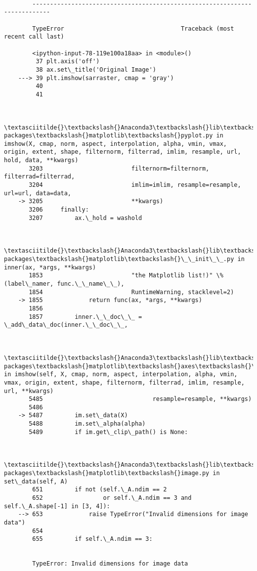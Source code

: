 \documentclass[11pt]{article}
\begin{document}
    \begin{Verbatim}[commandchars=\\\{\}]

        ---------------------------------------------------------------------------

        TypeError                                 Traceback (most recent call last)

        <ipython-input-78-119e100a18aa> in <module>()
         37 plt.axis('off')
         38 ax.set\_title('Original Image')
    ---> 39 plt.imshow(sarraster, cmap = 'gray')
         40 
         41 
    

        \textasciitilde{}\textbackslash{}Anaconda3\textbackslash{}lib\textbackslash{}site-packages\textbackslash{}matplotlib\textbackslash{}pyplot.py in imshow(X, cmap, norm, aspect, interpolation, alpha, vmin, vmax, origin, extent, shape, filternorm, filterrad, imlim, resample, url, hold, data, **kwargs)
       3203                         filternorm=filternorm, filterrad=filterrad,
       3204                         imlim=imlim, resample=resample, url=url, data=data,
    -> 3205                         **kwargs)
       3206     finally:
       3207         ax.\_hold = washold
    

        \textasciitilde{}\textbackslash{}Anaconda3\textbackslash{}lib\textbackslash{}site-packages\textbackslash{}matplotlib\textbackslash{}\_\_init\_\_.py in inner(ax, *args, **kwargs)
       1853                         "the Matplotlib list!)" \% (label\_namer, func.\_\_name\_\_),
       1854                         RuntimeWarning, stacklevel=2)
    -> 1855             return func(ax, *args, **kwargs)
       1856 
       1857         inner.\_\_doc\_\_ = \_add\_data\_doc(inner.\_\_doc\_\_,
    

        \textasciitilde{}\textbackslash{}Anaconda3\textbackslash{}lib\textbackslash{}site-packages\textbackslash{}matplotlib\textbackslash{}axes\textbackslash{}\_axes.py in imshow(self, X, cmap, norm, aspect, interpolation, alpha, vmin, vmax, origin, extent, shape, filternorm, filterrad, imlim, resample, url, **kwargs)
       5485                               resample=resample, **kwargs)
       5486 
    -> 5487         im.set\_data(X)
       5488         im.set\_alpha(alpha)
       5489         if im.get\_clip\_path() is None:
    

        \textasciitilde{}\textbackslash{}Anaconda3\textbackslash{}lib\textbackslash{}site-packages\textbackslash{}matplotlib\textbackslash{}image.py in set\_data(self, A)
        651         if not (self.\_A.ndim == 2
        652                 or self.\_A.ndim == 3 and self.\_A.shape[-1] in [3, 4]):
    --> 653             raise TypeError("Invalid dimensions for image data")
        654 
        655         if self.\_A.ndim == 3:
    

        TypeError: Invalid dimensions for image data

    \end{Verbatim}
\end{document}
